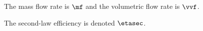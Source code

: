 \documentclass{article}
\begin{document}
The mass flow rate is $\mf$ and the volumetric flow rate is $\vvf$.

The second-law efficiency is denoted $\etasec$.
\end{document}
